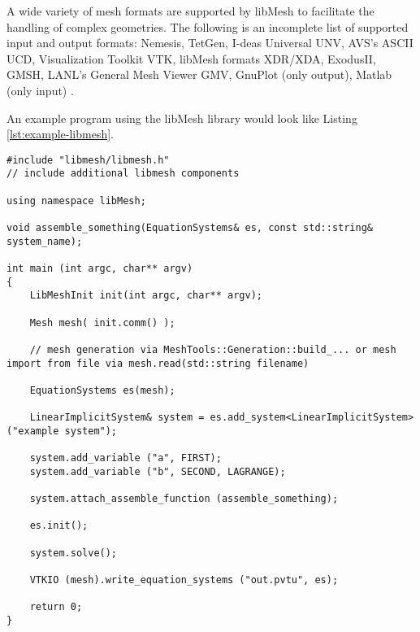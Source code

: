  A wide variety of mesh formats are supported by libMesh to facilitate the handling of complex geometries. The following is an incomplete list of supported input and output formats: Nemesis, TetGen, I-deas Universal UNV, AVS's ASCII UCD, Visualization Toolkit VTK, libMesh formats XDR/XDA, ExodusII, GMSH, LANL's General Mesh Viewer GMV, GnuPlot (only output), Matlab (only input) \cite{kirk2013case}.
 
 An example program using the libMesh library would look like Listing \ref{lst:example-libmesh}.
 \begin{lstlisting}[caption=Example libMesh program,label=lst:example-libmesh]
#include "libmesh/libmesh.h"
// include additional libmesh components

using namespace libMesh;

void assemble_something(EquationSystems& es, const std::string& system_name);

int main (int argc, char** argv)
{
	LibMeshInit init(int argc, char** argv);
	
	Mesh mesh( init.comm() );
	
	// mesh generation via MeshTools::Generation::build_... or mesh import from file via mesh.read(std::string filename)
	
	EquationSystems es(mesh);
	
	LinearImplicitSystem& system = es.add_system<LinearImplicitSystem> ("example system");
	
	system.add_variable ("a", FIRST);
	system.add_variable ("b", SECOND, LAGRANGE);
	
	system.attach_assemble_function (assemble_something);

	es.init();
	
	system.solve();
	
	VTKIO (mesh).write_equation_systems ("out.pvtu", es);
	
	return 0;
}
 \end{lstlisting}
